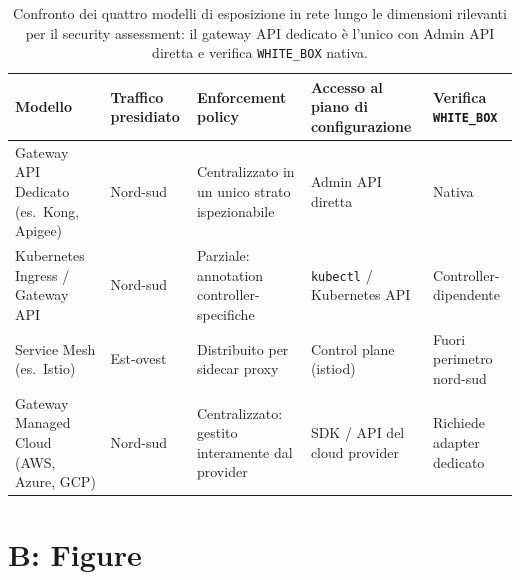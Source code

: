 \begin{table}[ht]
  \centering \small
  \begin{tabularx}{\textwidth}{@{} p{3.0cm} p{1.8cm} X X X @{}}
    \toprule
    \textbf{Modello}
     & \textbf{Traffico presidiato}
     & \textbf{Enforcement policy}
     & \textbf{Accesso al piano di configurazione}
     & \textbf{Verifica \texttt{WHITE\_BOX}}           \\
    \midrule
    Gateway \gls{API} Dedicato (es.\ Kong, Apigee)
     & Nord-sud
     & Centralizzato in un unico strato ispezionabile
     & Admin \gls{API} diretta
     & Nativa                                          \\
    \addlinespace
    Kubernetes Ingress / Gateway \gls{API}
     & Nord-sud
     & Parziale: annotation controller-specifiche
     & \texttt{kubectl} / Kubernetes \gls{API}
     & Controller-dipendente                           \\
    \addlinespace
    Service Mesh (es.\ Istio)
     & Est-ovest
     & Distribuito per sidecar proxy
     & Control plane (istiod)
     & Fuori perimetro nord-sud                        \\
    \addlinespace
    Gateway Managed Cloud (AWS, Azure, GCP)
     & Nord-sud
     & Centralizzato: gestito interamente dal provider
     & \gls{SDK} / \gls{API} del cloud provider
     & Richiede adapter dedicato                       \\
    \bottomrule
  \end{tabularx}
  \caption{Confronto dei quattro modelli di esposizione in rete lungo le dimensioni rilevanti per il security assessment: il gateway \gls{API} dedicato è l'unico con Admin \gls{API} diretta e verifica \texttt{WHITE\_BOX} nativa.}
  \label{tab:modelli-esposizione}
\end{table}

\section*{B: Figure}


